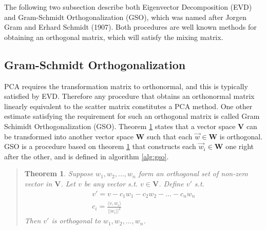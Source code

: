 \documentclass[11pt]{article}
\newtheorem{thm}{Theorem}[section]
\begin{document}


The following two subsection describe both Eigenvector Decomposition (EVD) and Gram-Schmidt Orthogonalization (GSO), which was named after Jorgen Gram and Erhard Schmidt (1907).  Both procedures are well known methods for obtaining an orthogonal matrix, which will satisfy the mixing matrix.  %


\subsection{Gram-Schmidt Orthogonalization}
PCA requires the transformation matrix to orthonormal, and this is typically satisfied by EVD. %
Therefore any procedure that obtains an orthonormal matrix linearly equivalent to the scatter matrix constitutes a PCA method.  
One other estimate satisfying the requirement for such an orthogonal matrix is called Gram Schimidt Orthogonalization (GSO).    
Theorem \ref{gso-theorem} states that a vector space $\mathbf{V}$ can be transformed into another vector space $\mathbf{W}$ such that each $\vec{w}\in \mathbf{W}$ is orthogonal.  GSO is a procedure based on theorem \ref{gso-theorem} that constructs each $\vec{w}_i \in \mathbf{W}$ one right after the other, and is defined in algorithm \ref{alg:gso}. 

\begin{quote}
\begin{thm} 
\label{gso-theorem}
Suppose $w_1, w_2, ..., w_n$ form an orthogonal set of non-zero vector in $\mathbf{V}$.  Let $v$ be any vector s.t. $v \in \mathbf{V}$.  Define $v'$ s.t. 
\begin{eqnarray}
v' = v - c_1 w_1 - c_2 w_2 - ... - c_n w_n \label{GSTheorem}\\
c_i = \frac{\langle v , w_i \rangle} {||w_i||^2}
\end{eqnarray}
Then $v'$ is orthogonal to $w_1, w_2, ..., w_n$.
\end{thm} \cite[211]{schaums-linear-algebra}
\end{quote}
\end{document}
